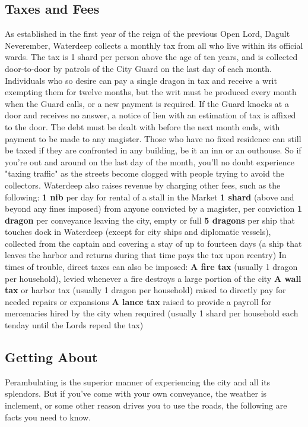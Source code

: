 \documentclass[10pt,a4paper,twoside,twocolumn,openany,nodeprecatedcode]{dndbook}
\begin{document}
\subsection{Taxes and Fees}
As established in the first year of the reign of the previous Open Lord, Dagult Neverember, Waterdeep collects a monthly tax from all who live within its official wards. The tax is 1 shard per person above the age of ten years, and is collected door-to-door by patrols of the City Guard on the last day of each month.
Individuals who so desire can pay a single dragon in tax and receive a writ exempting them for twelve months, but the writ must be produced every month when the Guard calls, or a new payment is required. If the Guard knocks at a door and receives no answer, a notice of lien with an estimation of tax is affixed to the door. The debt must be dealt with before the next month ends, with payment to be made to any magister.
Those who have no fixed residence can still be taxed if they are confronted in any building, be it an inn or an outhouse. So if you're out and around on the last day of the month, you'll no doubt experience "taxing traffic" as the streets become clogged with people trying to avoid the collectors.
Waterdeep also raises revenue by charging other fees, such as the following: \textbf{1 nib} per day for rental of a stall in the Market \textbf{1 shard} (above and beyond any fines imposed) from anyone convicted by a magister, per conviction \textbf{1 dragon} per conveyance leaving the city, empty or full \textbf{5 dragons} per ship that touches dock in Waterdeep (except for city ships and diplomatic vessels), collected from the captain and covering a stay of up to fourteen days (a ship that leaves the harbor and returns during that time pays the tax upon reentry)
In times of trouble, direct taxes can also be imposed: \textbf{A fire tax} (usually 1 dragon per household), levied whenever a fire destroys a large portion of the city \textbf{A wall tax} or harbor tax (usually 1 dragon per household) raised to directly pay for needed repairs or expansions \textbf{A lance tax} raised to provide a payroll for mercenaries hired by the city when required (usually 1 shard per household each tenday until the Lords repeal the tax)
\subsection{Getting About}
Perambulating is the superior manner of experiencing the city and all its splendors. But if you've come with your own conveyance, the weather is inclement, or some other reason drives you to use the roads, the following are facts you need to know.
\end{document}
